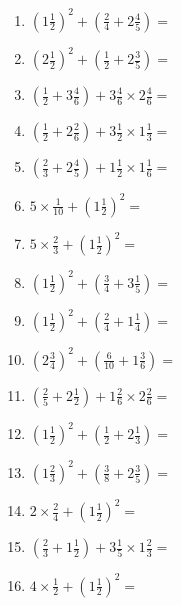 \documentclass[12pt]{article}
\begin{document}
\begin{enumerate}
\newpage
\item \large $ (1 \frac{1}{2})^2 + (\frac{2}{4} + 2 \frac{4}{5}) = $ \vspace{1.8cm}
\item \large $ (2 \frac{1}{2})^2 + (\frac{1}{2} + 2 \frac{3}{5}) = $ \vspace{1.8cm}
\item \large $ (\frac{1}{2} + 3 \frac{4}{6}) + 3 \frac{4}{6} \times 2 \frac{4}{6} = $ \vspace{1.8cm}
\item \large $ (\frac{1}{2} + 2 \frac{2}{6}) + 3 \frac{1}{2} \times 1 \frac{1}{3} = $ \vspace{1.8cm}
\item \large $ (\frac{2}{3} + 2 \frac{4}{5}) + 1 \frac{1}{2} \times 1 \frac{1}{6} = $ \vspace{1.8cm}
\item \large $ 5 \times \frac{1}{10} + (1 \frac{1}{2})^2 = $ \vspace{1.8cm}
\item \large $ 5 \times \frac{2}{3} + (1 \frac{1}{2})^2 = $ \vspace{1.8cm}
\item \large $ (1 \frac{1}{2})^2 + (\frac{3}{4} + 3 \frac{1}{5}) = $ \vspace{1.8cm}
\item \large $ (1 \frac{1}{2})^2 + (\frac{2}{4} + 1 \frac{1}{4}) = $ \vspace{1.8cm}
\item \large $ (2 \frac{3}{4})^2 + (\frac{6}{10} + 1 \frac{3}{6}) = $ \vspace{1.8cm}
\newpage
\item \large $ (\frac{2}{5} + 2 \frac{1}{2}) + 1 \frac{2}{6} \times 2 \frac{2}{6} = $ \vspace{1.8cm}
\item \large $ (1 \frac{1}{2})^2 + (\frac{1}{2} + 2 \frac{1}{3}) = $ \vspace{1.8cm}
\item \large $ (1 \frac{2}{3})^2 + (\frac{3}{8} + 2 \frac{3}{5}) = $ \vspace{1.8cm}
\item \large $ 2 \times \frac{2}{4} + (1 \frac{1}{2})^2 = $ \vspace{1.8cm}
\item \large $ (\frac{2}{3} + 1 \frac{1}{2}) + 3 \frac{1}{5} \times 1 \frac{2}{3} = $ \vspace{1.8cm}
\item \large $ 4 \times \frac{1}{2} + (1 \frac{1}{2})^2 = $ \vspace{1.8cm}

\end{enumerate}
\end{document}

